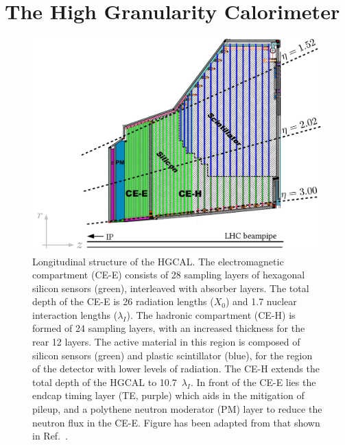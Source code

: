 \section{The High Granularity Calorimeter}\label{sec:hgcal}
\begin{figure}[!tb]
  \centering
  \includegraphics[width=1\textwidth]{Figures/cms/hgcal.pdf}
  \caption[Longitudinal structure of the High-Granularity Calorimeter]
  {
    Longitudinal structure of the HGCAL. The electromagnetic compartment (CE-E) consists of 28 sampling layers of hexagonal silicon sensors (green), interleaved with absorber layers. The total depth of the CE-E is 26 radiation lengths ($X_0$) and 1.7 nuclear interaction lengths ($\lambda_I$). The hadronic compartment (CE-H) is formed of 24 sampling layers, with an increased thickness for the rear 12 layers. The active material in this region is composed of silicon sensors (green) and plastic scintillator (blue), for the region of the detector with lower levels of radiation. The CE-H extends the total depth of the HGCAL to 10.7~$\lambda_I$. In front of the CE-E lies the endcap timing layer (TE, purple) which aids in the mitigation of pileup, and a polythene neutron moderator (PM) layer to reduce the neutron flux in the CE-E. Figure has been adapted from that shown in Ref.~\cite{CERN-LHCC-2017-023}.
  }
  \label{fig:cms_hgcal}
\end{figure}

